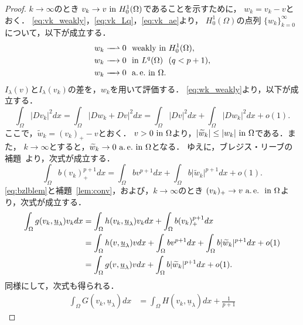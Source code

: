 \begin{proof}
 $k \to \infty$のとき
 $v_k \to v ~\tin H_0^1(\Omega)$であることを示すために，
 $w_k = v_k - v$とおく．
 \eqref{eq:vk_weakly}，\eqref{eq:vk_Lq}，\eqref{eq:vk_ae}より，
 $H_0^1(\Omega)$の点列
 $\{ w_k \}_{k=0}^\infty$について，以下が成立する．
 \begin{align}
  w_k \xrightharpoonup{ \mbox{ ~ } } 0 & \ \ \text{weakly~} \tin
  H_0^1(\Omega), \label{eq:wk_weakly} \\
  w_k \xrightarrow{ \mbox{ ~ } } 0 & \ \ \tin L^q(\Omega) \ \
  (q < p+1), \label{eq:wk_Lq} \\
  w_k \xrightarrow{ \mbox{ ~ } } 0 & \ \ \ae \tin \Omega. 
  \label{eq:wk_ae}
 \end{align}
 $I_\lambda(v)$と$I_\lambda(v_k)$の差を，$w_k$を用いて評価する．
 \eqref{eq:wk_weakly}より，以下が成立する．
 \begin{equation}
  \int_\Omega \lvert D v_k \rvert^2 dx = \int_\Omega \lvert Dw_k + Dv
   \rvert^2 dx = \int_\Omega \lvert Dv \rvert^2 dx + \int_\Omega \lvert
   Dw_k \rvert^2 dx + o(1). \label{eq:Dvk_Dwk}
 \end{equation}
 ここで，$\tilde{w}_k = (v_k)_+ - v$とおく．
 $v > 0 ~\tin \Omega$より，$\lvert \tilde{w}_k \rvert \leq \lvert w_k
 \rvert ~\tin \Omega$である．また，
 $k \to \infty$とすると，$\tilde{w}_k \to 0 ~\ae \tin \Omega$となる．
 ゆえに，ブレジス・リーブの補題~\cite{MR699419}より，次式が成立する．
 \begin{equation}
  \int_\Omega b(v_k)_{+}^{p+1} dx = \int_\Omega bv^{p+1} dx +
   \int_\Omega b \lvert \tilde{w}_k \rvert^{p+1} dx + o(1).
   \label{eq:bzlblem}
 \end{equation}
 \eqref{eq:bzlblem}と補題~\ref{lem:conv}，および，$k \to \infty$のとき
 $(v_k)_+ \to v ~\ae ~\tin \Omega$より，次式が成立する．
 \begin{align}
  \int_\Omega g(v_k, \underline{u}_\lambda) v_k dx &= \int_\Omega
  h(v_k, \underline{u}_\lambda) v_k dx + \int_\Omega b (v_k)_+^{p+1}
  dx \notag \\
  &= \int_\Omega
  h(v, \underline{u}_\lambda) v dx + \int_\Omega b v^{p+1}
  dx + \int_\Omega b \lvert \tilde{w}_k \lvert^{p+1} dx + o(1) \notag \\
  &= \int_\Omega g(v, \underline{u}_\lambda) v dx + 
  \int_\Omega b \lvert \tilde{w}_k \lvert^{p+1} dx + o(1). \label{eq:w_k_1}
 \end{align}
 同様にして，次式も得られる．
 \begin{align}
  \int_\Omega G(v_k, \underline{u}_\lambda) dx &= 
  \int_\Omega H(v_k, \underline{u}_\lambda) dx + \frac{1}{p+1}

\end{align}
\end{proof}
